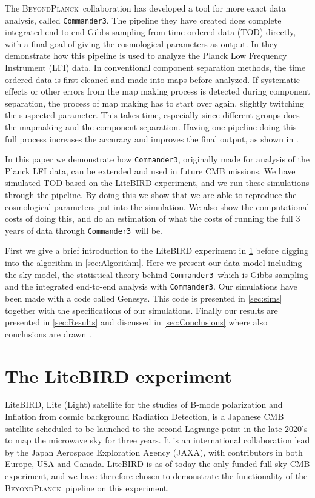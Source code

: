 \documentclass[twocolumn]{aa}
\def\commanderthree{\texttt{Commander3}}
\newcommand{\BP}{\textsc{BeyondPlanck}}
\begin{document}
The \BP\ collaboration has developed a tool for more exact data analysis, called \commanderthree. The pipeline they have created does complete integrated end-to-end Gibbs sampling from time ordered data (TOD) directly, with a final goal of giving the cosmological parameters as output. In \citet{bp01} they demonstrate how this pipeline is used to analyze the Planck Low Frequency Instrument (LFI) data. In conventional component separation methods, the time ordered data is first cleaned and made into maps before analyzed. If systematic effects or other errors from the map making process is detected during component separation, the process of map making has to start over again, slightly twitching the suspected parameter. This takes time, especially since different groups does the mapmaking and the component separation. Having one pipeline doing this full process increases the accuracy and improves the final output, as shown in \citet{bp01}.

In this paper we demonstrate how \commanderthree, originally made for analysis of the Planck LFI data, can be extended and used in future CMB missions. We have simulated TOD based on the LiteBIRD experiment, and we run these simulations through the pipeline. By doing this we show that we are able to reproduce the cosmological parameters put into the simulation. We also show the computational costs of doing this, and do an estimation of what the costs of running the full 3 years of data through \commanderthree\ will be. 

First we give a brief introduction to the LiteBIRD experiment in \ref{sec:LB} before digging into the algorithm in \ref{sec:Algorithm}. Here we present our data model including the sky model, the statistical theory behind \commanderthree\ which is Gibbs sampling and the integrated end-to-end analysis with \commanderthree. Our simulations have been made with a code called Genesys. This code is presented in \ref{sec:sims} together with the specifications of our simulations. Finally our results are presented in \ref{sec:Results}  and discussed in \ref{sec:Conclusions} where also conclusions are drawn .





\section{The LiteBIRD experiment}
\label{sec:LB}
LiteBIRD, Lite (Light) satellite for the studies of B-mode polarization and Inflation from cosmic background Radiation Detection, is a Japanese CMB satellite scheduled to be launched to the second Lagrange point in the late 2020's \citep{LiteBIRD-paper?} to map the microwave sky for three years. It is an international collaboration lead by the Japan Aerospace Exploration Agency (JAXA), with contributors in both Europe, USA and Canada. LiteBIRD is as of today the only funded full sky CMB experiment, and we have therefore chosen to demonstrate the functionality of the \BP\ pipeline on this experiment.
\end{document}
